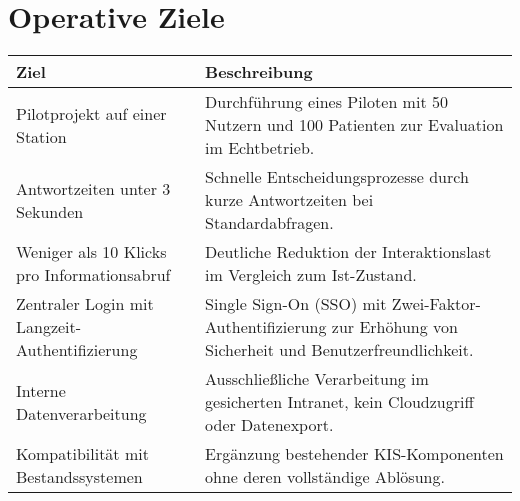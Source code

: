 \section{Operative Ziele}
\begin{center}
\begin{tabular}{|p{5cm}|p{10cm}|}
	\hline
	\textbf{Ziel} & \textbf{Beschreibung} \\
	\hline
	Pilotprojekt auf einer Station & Durchführung eines Piloten mit 50 Nutzern und 100 Patienten zur Evaluation im Echtbetrieb. \\
	\hline
	Antwortzeiten unter 3 Sekunden & Schnelle Entscheidungsprozesse durch kurze Antwortzeiten bei Standardabfragen. \\
	\hline
	Weniger als 10 Klicks pro Informationsabruf & Deutliche Reduktion der Interaktionslast im Vergleich zum Ist-Zustand. \\
	\hline
	Zentraler Login mit Langzeit-Authentifizierung & Single Sign-On (SSO) mit Zwei-Faktor-Authentifizierung zur Erhöhung von Sicherheit und Benutzerfreundlichkeit. \\
	\hline
	Interne Datenverarbeitung & Ausschließliche Verarbeitung im gesicherten Intranet, kein Cloudzugriff oder Datenexport. \\
	\hline
	Kompatibilität mit Bestandssystemen & Ergänzung bestehender KIS-Komponenten ohne deren vollständige Ablösung. \\
	\hline
\end{tabular}
\end{center}


